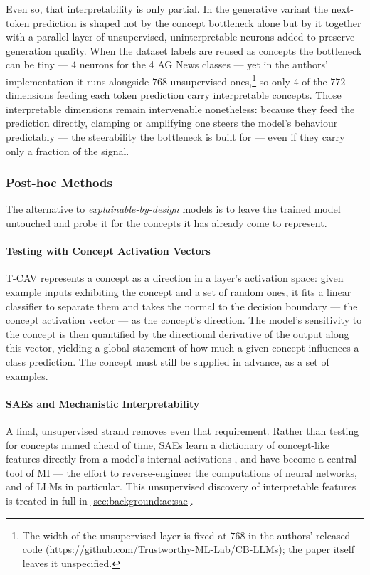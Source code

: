     Even so, that interpretability is only partial. In the generative variant
    the next-token prediction is shaped not by the concept bottleneck alone but
    by it together with a parallel layer of unsupervised, uninterpretable
    neurons added to preserve generation quality. When the dataset labels are
    reused as concepts the bottleneck can be tiny --- 4 neurons for the 4 AG
    News classes --- yet in the authors' implementation it runs alongside $768$
    unsupervised ones,\footnote{The width of the unsupervised layer is fixed at
    $768$ in the authors' released code
    (\url{https://github.com/Trustworthy-ML-Lab/CB-LLMs}); the paper itself
    leaves it unspecified.} so only 4 of the $772$ dimensions feeding each token
    prediction carry interpretable concepts. Those interpretable dimensions
    remain intervenable nonetheless: because they feed the prediction directly,
    clamping or amplifying one steers the model's behaviour predictably --- the
    steerability the bottleneck is built for --- even if they carry only a
    fraction of the signal.

\subsubsection{Post-hoc Methods}

The alternative to \textit{explainable-by-design} models is to leave the trained
model untouched and probe it for the concepts it has already come to represent.

    \paragraph{Testing with Concept Activation Vectors} T-CAV
    \citep{kimInterpretabilityFeatureAttribution2018} represents a concept as a
    direction in a layer's activation space: given example inputs exhibiting the
    concept and a set of random ones, it fits a linear classifier to separate
    them and takes the normal to the decision boundary --- the concept
    activation vector --- as the concept's direction. The model's sensitivity to
    the concept is then quantified by the directional derivative of the output
    along this vector, yielding a global statement of how much a given concept
    influences a class prediction. The concept must still be supplied in
    advance, as a set of examples.

    \paragraph{SAEs and Mechanistic Interpretability} A final, unsupervised
    strand removes even that requirement. Rather than testing for concepts named
    ahead of time, \acp{SAE} learn a dictionary of concept-like features
    directly from a model's internal activations
    \citep{hubenSparseAutoencodersFind2023}, and have become a central tool of
    \ac{MI} --- the effort to reverse-engineer the computations of neural
    networks, and of \aclp{LLM} in particular. This unsupervised discovery of
    interpretable features is treated in full in \cref{sec:background:ae:sae}.

